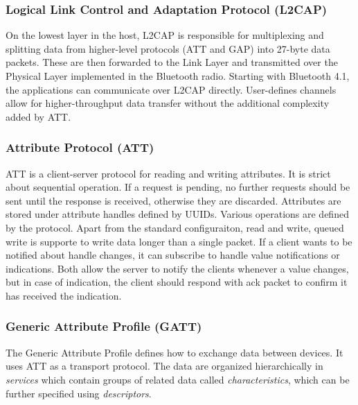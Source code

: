 \subsubsection{Logical Link Control and Adaptation Protocol (L2CAP)}

On the lowest layer in the host, L2CAP is responsible for multiplexing and splitting data from higher-level protocols (ATT and GAP) into 27-byte data packets. These are then forwarded to the Link Layer and transmitted over the Physical Layer implemented in the Bluetooth radio. Starting with Bluetooth 4.1, the applications can communicate over L2CAP directly. User-defines channels allow for higher-throughput data transfer without the additional complexity added by ATT.



\subsubsection{Attribute Protocol (ATT)}
ATT is a client-server protocol for reading and writing attributes. It is strict about sequential operation. If a request is pending, no further requests should be sent until the response is received, otherwise they are discarded. Attributes are stored under attribute handles defined by UUIDs. Various operations are defined by the protocol. Apart from the standard configuraiton, read and write, queued write is supporte to write data longer than a single packet. If a client wants to be notified about handle changes, it can subscribe to handle value notifications or indications. Both allow the server to notify the clients whenever a value changes, but in case of indication, the client should respond with ack packet to confirm it has received the indication.

\subsubsection{Generic Attribute Profile (GATT)}

The Generic Attribute Profile defines how to exchange data between devices. It uses ATT as a transport protocol. The data are organized hierarchically in \textit{services} which contain groups of related data called \textit{characteristics}, which can be further specified using \textit{descriptors}.

